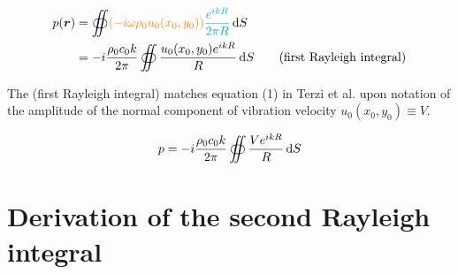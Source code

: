 \documentclass[12pt]{article}%
\begin{document}
\begin{align*}
p(\boldsymbol{r}) &=  \oiint \color{orange}(-i\omega \rho_0 u_0(x_0, y_0)) \color{cyan} \frac{e^{ikR}}{2\pi R} \color{black} \dif S  \\
&= -i\frac{\rho_0 c_0 k}{2\pi} \oiint \frac{u_0(x_0, y_0) e^{ikR}}{R} \color{black} \dif S \tag{first Rayleigh integral}
\end{align*}

\noindent The (first Rayleigh integral) matches equation (1) in Terzi et al. upon notation of the amplitude of the normal component of vibration velocity $u_0(x_0, y_0) \equiv V$. 

\begin{equation}
p = -i \frac{\rho_0 c_0 k}{2\pi} \oiint \frac{V e^{ikR}}{R}\dif S 
\end{equation}




\section{Derivation of the second Rayleigh integral}\label{Rayleigh 2}
\end{document}
